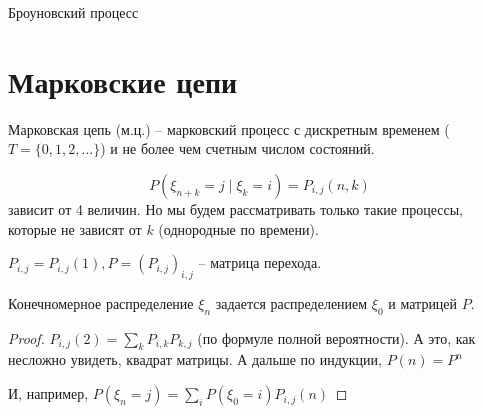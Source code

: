 

\TODO Броуновский процесс \TODO


\section{Марковские цепи}
\begin{Def}
Марковская цепь (м.ц.) -- марковский процесс с дискретным временем ($T = \{0, 1, 2, \dots \}$) и не более чем счетным числом состояний.
\end{Def}

$$P(\xi_{n+k} = j \mid \xi_k = i) = P_{i, j}(n, k)$$ зависит от 4 величин. Но мы будем рассматривать только такие процессы, которые не зависят от $k$ (однородные по времени).

\begin{Def}
$P_{i,j} = P_{i,j}(1), P = (P_{i, j})_{i, j}$ -- матрица перехода.
\end{Def}
\begin{theorem}
Конечномерное распределение $\xi_n$ задается распределением $\xi_0$ и матрицей $P$.
\end{theorem}
\begin{proof}
$P_{i,j}(2) = \sum\limits_k P_{i,k} P_{k, j}$ (по формуле полной вероятности). А это, как несложно увидеть, квадрат матрицы.
А дальше по индукции, $P(n) = P^n$

И, например, $P(\xi_n = j) = \sum\limits_i P(\xi_0 = i) P_{i,j}(n)$
\end{proof}
